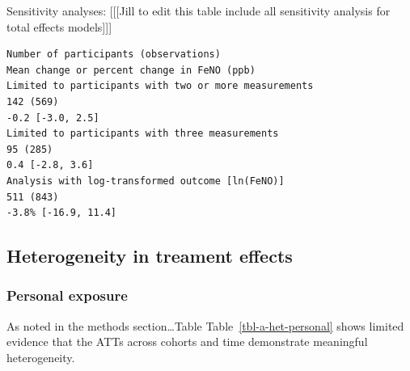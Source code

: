 \documentclass[
  letterpaper,
  DIV=11,
  numbers=noendperiod]{scrartcl}
\begin{document}
Sensitivity analyses: {[}{[}{[}Jill to edit this table include all
sensitivity analysis for total effects models{]}{]}{]}

\begin{verbatim}
Number of participants (observations)
Mean change or percent change in FeNO (ppb)
Limited to participants with two or more measurements
142 (569)
-0.2 [-3.0, 2.5]
Limited to participants with three measurements
95 (285)
0.4 [-2.8, 3.6]
Analysis with log-transformed outcome [ln(FeNO)]
511 (843)
-3.8% [-16.9, 11.4]
\end{verbatim}

\newpage

\hypertarget{heterogeneity-in-treament-effects}{%
\subsection{Heterogeneity in treament
effects}\label{heterogeneity-in-treament-effects}}

\hypertarget{personal-exposure}{%
\subsubsection{Personal exposure}\label{personal-exposure}}

As noted in the methods section\ldots Table
Table~\ref{tbl-a-het-personal} shows limited evidence that the ATTs
across cohorts and time demonstrate meaningful heterogeneity.
\end{document}
